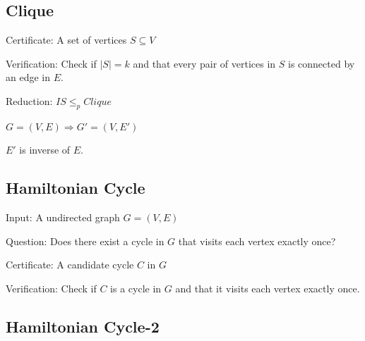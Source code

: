 \documentclass[12pt,a4paper]{article}
\begin{document}
\subsection*{Clique}

Certificate: A set of vertices $S \subseteq V$ 

Verification: Check if $|S| = k$ and that every pair of vertices in $S$ is connected by an edge in $E$.

Reduction: $IS \leq_p Clique$

$G = (V, E) \Rightarrow G' = (V, E')$

$E'$ is inverse of $E$.

\subsection*{Hamiltonian Cycle}

Input: A undirected graph $G = (V, E)$

Question: Does there exist a cycle in $G$ that visits each vertex exactly once?

Certificate: A candidate cycle $C$ in $G$

Verification: Check if $C$ is a cycle in $G$ and that it visits each vertex exactly once.

\subsection*{Hamiltonian Cycle-2}
\end{document}
